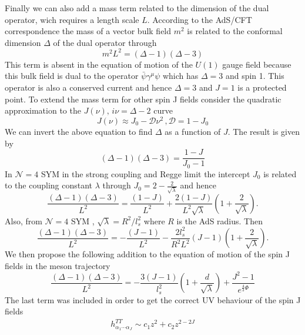 \documentclass[a4paper,12pt]{article}
\begin{document}
Finally we can also add a mass term related to the dimension of the dual operator, wich requires a length scale $L$. According to the AdS/CFT correspondence the mass of a vector bulk field $m^2$ is related to the conformal dimension $\Delta$ of the dual operator through
\begin{equation}
m^2 L^2 = \left(\Delta - 1 \right) \left(\Delta - 3 \right)
\end{equation}
This term is absent in the equation of motion of the $U\left(1\right)$ gauge field because this bulk field is dual to the operator $\bar{\psi} \gamma^\mu \psi$ which has $\Delta = 3$ and spin 1. This operator is also a conserved current and hence $\Delta = 3$ and $J = 1$ is a protected point. To extend the mass term for other spin J fields consider the quadratic approximation to the $J\left(\nu\right), \, i \nu = \Delta - 2$ curve
\begin{equation}
J\left(\nu\right) \approx J_0 - \mathcal{D} \nu^2\, , \mathcal{D} = 1 - J_0
\end{equation}
We can invert the above equation to find $\Delta$ as a function of $J$.  The result is given by
\begin{equation}
\left(\Delta -1\right) \left(\Delta - 3 \right) = \frac{1-J}{J_0 - 1}
\end{equation}
In $\mathcal{N} = 4$ SYM in the strong coupling and Regge limit the intercept $J_0$ is related to the coupling constant $\lambda$ through $J_0 = 2 - \frac{2}{\sqrt{\lambda}}$ and hence 
\begin{equation}
\frac{\left(\Delta -1\right) \left(\Delta - 3 \right)}{L^2} = \frac{\left(1-J\right)}{L^2} + \frac{2\left(1-J\right)}{L^2\sqrt{\lambda}}\left(1+\frac{2}{\sqrt{\lambda}}\right).
\end{equation}
Also, from $\mathcal{N} = 4$ SYM , $\sqrt{\lambda} = R^2 / l^2_s$ where $R$ is the AdS radius. Then
\begin{equation}
\frac{\left(\Delta -1\right) \left(\Delta - 3 \right)}{L^2} = -\frac{\left(J-1\right)}{L^2} - \frac{2 l_s^2}{R^2 L^2} \left(J-1\right) \left(1+\frac{2}{\sqrt{\lambda}}\right).
\end{equation}
We then propose the following addition to the equation of motion of the spin J fields in the meson trajectory
\begin{equation}
\frac{\left(\Delta -1\right) \left(\Delta - 3 \right)}{L^2} = -\frac{3\left(J-1\right)}{l_s^2} \left(1+\frac{d}{\sqrt{\lambda}}\right) + \frac{J^2 - 1}{e^{\frac{4}{3}\Phi}}
\end{equation}
The last term was included in order to get the correct UV behaviour of the spin J fields
\begin{align}
h^{TT}_{\alpha_1 \cdots \alpha_J} \sim c_1 z^2 + c_2 z^{2- 2J}
\end{align}
\end{document}
